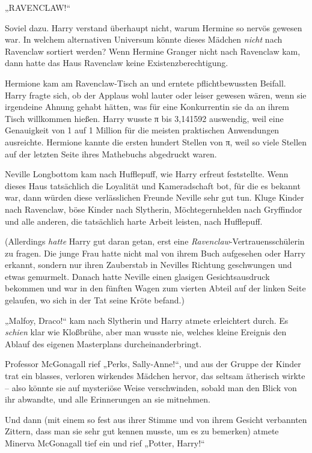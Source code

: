 „RAVENCLAW!“

Soviel dazu. Harry verstand überhaupt nicht, warum Hermine so nervös gewesen war. In welchem alternativen Universum könnte dieses Mädchen \emph{nicht} nach Ravenclaw sortiert werden? Wenn Hermine Granger nicht nach Ravenclaw kam, dann hatte das Haus Ravenclaw keine Existenzberechtigung.

Hermione kam am Ravenclaw-Tisch an und erntete pflichtbewussten Beifall. Harry fragte sich, ob der Applaus wohl lauter oder leiser gewesen wären, wenn sie irgendeine Ahnung gehabt hätten, was für eine Konkurrentin sie da an ihrem Tisch willkommen hießen. Harry wusste π bis 3,141592 auswendig, weil eine Genauigkeit von 1 auf 1 Million für die meisten praktischen Anwendungen ausreichte. Hermione kannte die ersten hundert Stellen von π, weil so viele Stellen auf der letzten Seite ihres Mathebuchs abgedruckt waren.

Neville Longbottom kam nach Hufflepuff, wie Harry erfreut feststellte. Wenn dieses Haus tatsächlich die Loyalität und Kameradschaft bot, für die es bekannt war, dann würden diese verlässlichen Freunde Neville sehr gut tun. Kluge Kinder nach Ravenclaw, böse Kinder nach Slytherin, Möchtegernhelden nach Gryffindor und alle anderen, die tatsächlich harte Arbeit leisten, nach Hufflepuff.

(Allerdings \emph{hatte} Harry gut daran getan, erst eine \emph{Ravenclaw}-Vertrauensschülerin zu fragen. Die junge Frau hatte nicht mal von ihrem Buch aufgesehen oder Harry erkannt, sondern nur ihren Zauberstab in Nevilles Richtung geschwungen und etwas gemurmelt. Danach hatte Neville einen glasigen Gesichtsausdruck bekommen und war in den fünften Wagen zum vierten Abteil auf der linken Seite gelaufen, wo sich in der Tat seine Kröte befand.)

„Malfoy, Draco!“ kam nach Slytherin und Harry atmete erleichtert durch. Es \emph{schien} klar wie Kloßbrühe, aber man wusste nie, welches kleine Ereignis den Ablauf des eigenen Masterplans durcheinanderbringt.

Professor McGonagall rief „Perks, Sally-Anne!“, und aus der Gruppe der Kinder trat ein blasses, verloren wirkendes Mädchen hervor, das seltsam ätherisch wirkte – also könnte sie auf mysteriöse Weise verschwinden, sobald man den Blick von ihr abwandte, und alle Erinnerungen an sie mitnehmen.

Und dann (mit einem so fest aus ihrer Stimme und von ihrem Gesicht verbannten Zittern, dass man sie sehr gut kennen musste, um es zu bemerken) atmete Minerva McGonagall tief ein und rief „Potter, Harry!“

